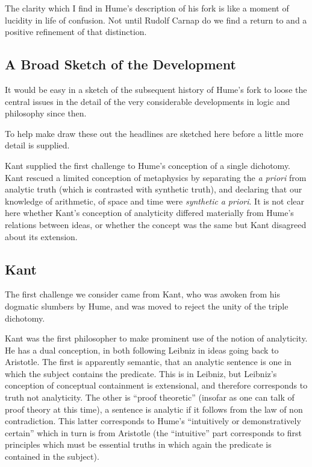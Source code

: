 The clarity which I find in Hume's description of his fork is like a
moment of lucidity in life of confusion. 
Not until Rudolf Carnap do we find a return to and a positive
refinement of that distinction.

\subsection{A Broad Sketch of the Development}

It would be easy in a sketch of the subsequent history of Hume's fork
to loose the central issues in the detail of the very considerable
developments in logic and philosophy since then.

To help make draw these out the headlines are sketched here before
a little more detail is supplied.

Kant supplied the first challenge to Hume's conception of a single
dichotomy.
Kant rescued a limited conception of metaphysics by separating
the \emph{a priori} from analytic truth (which is contrasted with
synthetic truth), and declaring that our knowledge of arithmetic, of
space and time were \emph{synthetic} \emph{a priori}.
It is not clear here whether Kant's conception of analyticity differed
materially from Hume's relations between ideas, or whether the concept
was the same but Kant disagreed about its extension.

\subsection{Kant}

The first challenge we consider came from Kant, who was awoken from
his dogmatic slumbers by Hume, and was moved to reject the unity of
the triple dichotomy.

Kant was the first philosopher to make prominent use of the notion of
analyticity.
He has a dual conception, in both following Leibniz in ideas going
back to Aristotle.
The first is apparently semantic, that an analytic sentence is one in which the
subject contains the predicate.
This is in Leibniz, but Leibniz's conception of conceptual containment
is extensional, and therefore corresponds to truth not analyticity.
The other is ``proof theoretic'' (insofar as one can talk of proof
theory at this time), a sentence is analytic if it follows
from the law of non contradiction.
This latter corresponds to Hume's ``intuitively or demonstratively
certain'' which in turn is from Aristotle (the ``intuitive'' part
corresponds to first principles which must be essential truths in
which again the predicate is contained in the subject).


